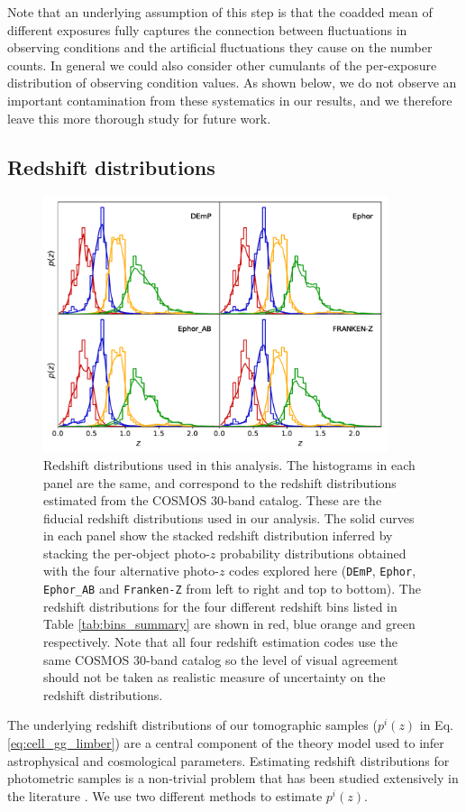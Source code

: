\documentclass[a4paper,11pt]{article}
\begin{document}
    Note that an underlying assumption of this step is that the coadded mean of different exposures fully captures the connection between fluctuations in observing conditions and the artificial fluctuations they cause on the number counts. In general we could also consider other cumulants of the per-exposure distribution of observing condition values. As shown below, we do not observe an important contamination from these systematics in our results, and we therefore leave this more thorough study for future work.

  \subsection{Redshift distributions}\label{ssec:methods.nz}
    \begin{figure}
      \centering
      \includegraphics[width=0.9\textwidth]{figures/nzs.pdf}
      \caption{Redshift distributions used in this analysis. The histograms in each panel are the same, and correspond to the redshift distributions estimated from the COSMOS 30-band catalog. These are the fiducial redshift distributions used in our analysis. The solid curves in each panel show the stacked redshift distribution inferred by stacking the per-object photo-$z$ probability distributions obtained with the four alternative photo-$z$ codes explored here ({\tt DEmP}, {\tt Ephor}, {\tt Ephor\_AB} and {\tt Franken-Z} from left to right and top to bottom). The redshift distributions for the four different redshift bins listed in Table \ref{tab:bins_summary} are shown in red, blue orange and green respectively. Note that all four redshift estimation codes use the same COSMOS 30-band catalog so the level of visual agreement should not be taken as realistic measure of uncertainty on the redshift distributions.}
      \label{fig:nzs}
    \end{figure}
    The underlying redshift distributions of our tomographic samples ($p^i(z)$ in Eq. \ref{eq:cell_gg_limber}) are a central component of the theory model used to infer astrophysical and cosmological parameters. Estimating redshift distributions for photometric samples is a non-trivial problem that has been studied extensively in the literature \citep{2008MNRAS.390..118L,2008ApJ...684...88N,2018MNRAS.478..592H}. We use two different methods to estimate $p^i(z)$.
    
\end{document}
